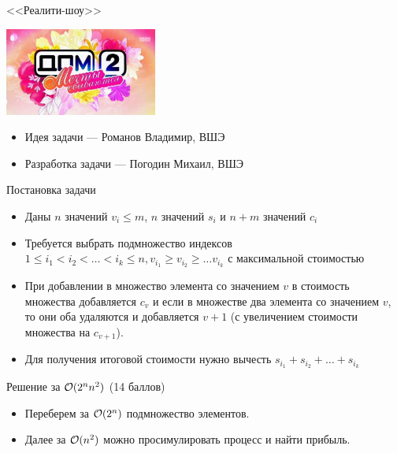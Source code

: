 \begin{frame}
  \begin{center}
    \LARGE <<Реалити-шоу>>
  \end{center}

  \begin{center}
      \includegraphics[width=5cm]{g-meme.jpg}
  \end{center}

  \begin{itemize}
  \item Идея задачи --- Романов Владимир, ВШЭ
  \item Разработка задачи --- Погодин Михаил, ВШЭ
  \end{itemize}

\end{frame}

\begin{frame}{Постановка задачи}
  \begin{itemize}
    \vspace{-1em}
  \item Даны $n$ значений $v_i \leq m$, $n$ значений $s_i$ и $n + m$ значений $c_i$
  \item Требуется выбрать подмножество индексов $1 \leq i_1 < i_2 < \ldots < i_k \leq n, v_{i_1} \geq v_{i_2} \geq \ldots v_{i_k}$ с максимальной стоимостью
  \item При добавлении в множество элемента со значением $v$ в стоимость множества добавляется $c_v$ и если в множестве два элемента со значением $v$, то они оба удаляются и добавляется $v + 1$ (с увеличением стоимости множества на $c_{v+1}$).
  \item Для получения итоговой стоимости нужно вычесть $s_{i_1} + s_{i_2} + \ldots + s_{i_k}$
  \end{itemize}
\end{frame}

\begin{frame}{Решение за $\mathcal{O}(2^n n^2)$ (14 баллов)}
  \begin{itemize}
  \item Переберем за $\mathcal{O}(2^n)$ подмножество элементов.
  \item Далее за $\mathcal{O}(n^2)$ можно просимулировать процесс и найти прибыль.
  \end{itemize}
\end{frame}

